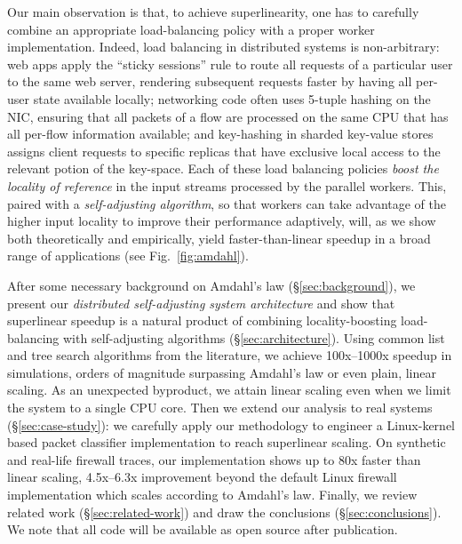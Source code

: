Our main observation is that, to achieve superlinearity, one has to carefully combine an appropriate load-balancing policy with a proper worker implementation. Indeed, load balancing in distributed systems is non-arbitrary: web apps apply the ``sticky sessions'' rule to route all requests of a particular user to the same web server, rendering subsequent requests faster by having all per-user state available locally; networking code often uses 5-tuple hashing on the NIC, ensuring that all packets of a flow are processed on the same CPU that has all per-flow information  available; and key-hashing in sharded key-value stores assigns client requests to specific replicas that have exclusive local access to the relevant potion of the key-space. Each of these load balancing policies \emph{boost the locality of reference} in the input streams processed by the parallel workers. This, paired with a \emph{self-adjusting algorithm}, so that workers can take advantage of the higher input locality to improve their performance adaptively, will, as we show both theoretically and empirically, yield faster-than-linear speedup in a broad range of applications (see Fig.~\ref{fig:amdahl}). %

After some necessary background on Amdahl's law (\S\ref{sec:background}), we present our \emph{distributed self-adjusting system architecture} and show that superlinear speedup is a natural product of combining locality-boosting load-balancing with self-adjusting algorithms (\S\ref{sec:architecture}). Using common list and tree search algorithms from the literature, we achieve 100x--1000x speedup in simulations, orders of magnitude surpassing Amdahl's law or even plain, linear scaling. As an unexpected byproduct, we attain linear scaling even when we limit the system to a single CPU core. Then we extend our analysis to real systems (\S\ref{sec:case-study}): we carefully apply our methodology to engineer a Linux-kernel based packet classifier implementation to reach superlinear scaling. On synthetic and real-life firewall traces, our implementation shows up to 80x faster than linear scaling, 4.5x--6.3x improvement beyond the default Linux firewall implementation which scales according to Amdahl's law. Finally, we review related work (\S\ref{sec:related-work}) and draw the conclusions (\S\ref{sec:conclusions}). We note that all code will be available as open source after publication.


